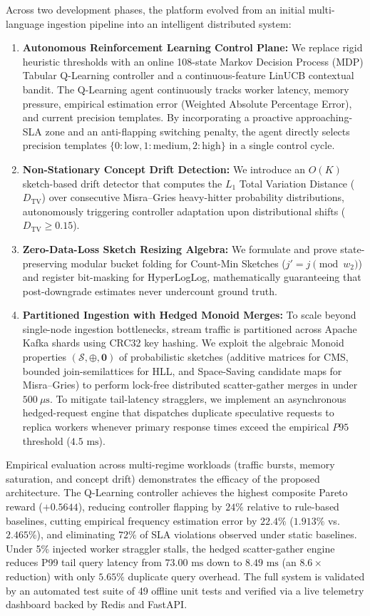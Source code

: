 Across two development phases, the platform evolved from an initial multi-language ingestion pipeline into an intelligent distributed system:
\begin{enumerate}
 \item \textbf{Autonomous Reinforcement Learning Control Plane:} We replace rigid heuristic thresholds with an online 108-state Markov Decision Process (MDP) Tabular Q-Learning controller and a continuous-feature LinUCB contextual bandit. The Q-Learning agent continuously tracks worker latency, memory pressure, empirical estimation error (Weighted Absolute Percentage Error), and current precision templates. By incorporating a proactive approaching-SLA zone and an anti-flapping switching penalty, the agent directly selects precision templates $\{0: \text{low}, 1: \text{medium}, 2: \text{high}\}$ in a single control cycle.
 \item \textbf{Non-Stationary Concept Drift Detection:} We introduce an $O(K)$ sketch-based drift detector that computes the $L_1$ Total Variation Distance ($D_{\text{TV}}$) over consecutive Misra--Gries heavy-hitter probability distributions, autonomously triggering controller adaptation upon distributional shifts ($D_{\text{TV}} \ge 0.15$).
 \item \textbf{Zero-Data-Loss Sketch Resizing Algebra:} We formulate and prove state-preserving modular bucket folding for Count-Min Sketches ($j' = j \pmod{w_2}$) and register bit-masking for HyperLogLog, mathematically guaranteeing that post-downgrade estimates never undercount ground truth.
 \item \textbf{Partitioned Ingestion with Hedged Monoid Merges:} To scale beyond single-node ingestion bottlenecks, stream traffic is partitioned across Apache Kafka shards using CRC32 key hashing. We exploit the algebraic Monoid properties $(\mathcal{S}, \oplus, \mathbf{0})$ of probabilistic sketches (additive matrices for CMS, bounded join-semilattices for HLL, and Space-Saving candidate maps for Misra--Gries) to perform lock-free distributed scatter-gather merges in under $500\ \mu\text{s}$. To mitigate tail-latency stragglers, we implement an asynchronous hedged-request engine that dispatches duplicate speculative requests to replica workers whenever primary response times exceed the empirical $P95$ threshold ($4.5\text{ ms}$).
\end{enumerate}

Empirical evaluation across multi-regime workloads (traffic bursts, memory saturation, and concept drift) demonstrates the efficacy of the proposed architecture. The Q-Learning controller achieves the highest composite Pareto reward ($+0.5644$), reducing controller flapping by $24\%$ relative to rule-based baselines, cutting empirical frequency estimation error by $22.4\%$ ($1.913\%$ vs. $2.465\%$), and eliminating $72\%$ of SLA violations observed under static baselines. Under 5\% injected worker straggler stalls, the hedged scatter-gather engine reduces P99 tail query latency from $73.00\text{ ms}$ down to $8.49\text{ ms}$ (an $8.6\times$ reduction) with only $5.65\%$ duplicate query overhead. The full system is validated by an automated test suite of 49 offline unit tests and verified via a live telemetry dashboard backed by Redis and FastAPI.
